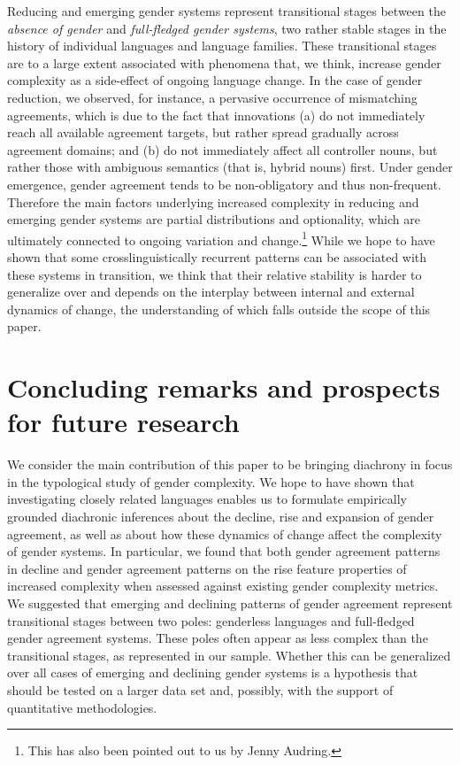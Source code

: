 \documentclass[output=collectionpaper]{langsci/langscibook}
\begin{document}
Reducing and emerging gender systems represent transitional stages between the \textit{absence of gender} and \textit{full-fledged gender systems}, two rather stable stages in the history of individual languages and language families. These transitional stages are to a large extent associated with phenomena that, we think, increase gender complexity as a side-effect of ongoing language change. In the case of gender reduction, we observed, for instance, a pervasive occurrence of mismatching agreements, which is due to the fact that innovations (a) do not immediately reach all available agreement targets, but rather spread gradually across agreement domains; and (b) do not immediately affect all controller nouns, but rather those with ambiguous semantics (that is, hybrid nouns) first. Under gender emergence, gender agreement tends to be non-obligatory and thus non-frequent. Therefore the main factors underlying increased complexity in reducing and emerging gender systems are partial distributions and optionality, which are ultimately connected to ongoing variation and change.\footnote{This has also been pointed out to us by Jenny Audring.} While we hope to have shown that some crosslinguistically recurrent patterns can be associated with these systems in transition, we think that their relative stability is harder to generalize over and depends on the interplay between internal and external dynamics of change, the understanding of which falls outside the scope of this paper.


\section{Concluding remarks and prospects for future research}
\label{sec:dgm:conclusion}
We consider the main contribution of this paper to be bringing diachrony in focus in the typological study of gender complexity.
We hope to have shown that investigating closely related languages enables us to formulate empirically grounded diachronic inferences about the decline, rise and expansion of gender agreement, as well as about how these dynamics of change affect the complexity of gender systems. In particular, we found that both gender agreement patterns in decline and gender agreement patterns on the rise feature properties of increased complexity when assessed against existing gender complexity metrics. We suggested that emerging and declining patterns of gender agreement represent transitional stages between two poles: genderless languages and full-fledged gender agreement systems. These poles often appear as less complex than the transitional stages, as represented in our sample. Whether this can be generalized over all cases of emerging and declining gender systems is a hypothesis that should be tested on a larger data set and, possibly, with the support of quantitative methodologies.
\end{document}
